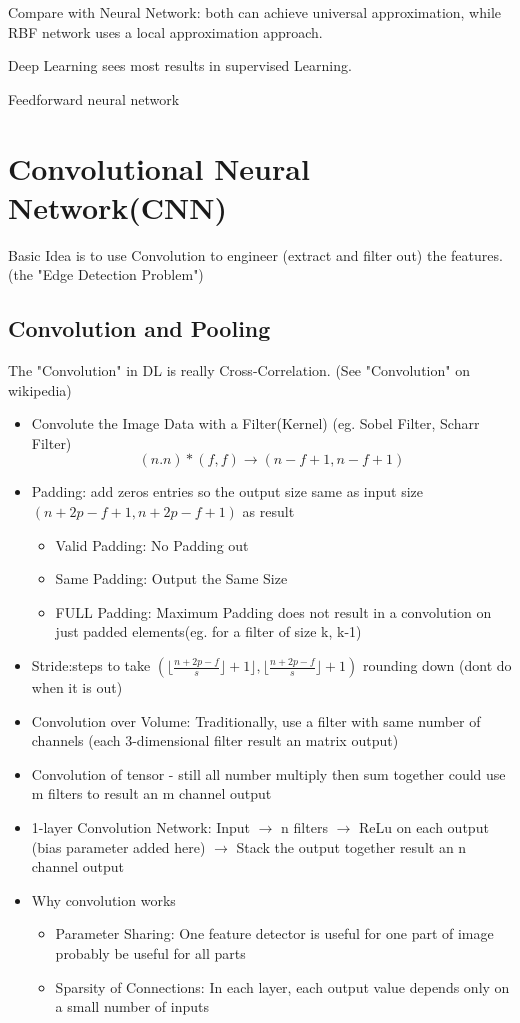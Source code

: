 \documentclass[11pt, openany]{book}              %
\begin{document}
Compare with Neural Network: both can achieve universal approximation, while RBF network uses a local approximation approach. 

Deep Learning sees most results in supervised Learning.

Feedforward neural network 



\section{Convolutional Neural Network(CNN)}

Basic Idea is to use Convolution to engineer (extract and filter out) the features. (the "Edge Detection Problem")

\subsection{Convolution and Pooling}

The "Convolution" in DL is really Cross-Correlation. (See "Convolution" on wikipedia)
\begin{itemize}
\item Convolute the Image Data with a Filter(Kernel) (eg. Sobel Filter, Scharr Filter)
$$(n.n) * (f, f) \rightarrow (n-f+1, n-f+1)$$
\item Padding: add zeros entries so the output size same as input size
$(n+2p-f+1, n+2p-f+1)$ as result
\begin{itemize}
	\item Valid Padding: No Padding out
	\item Same Padding: Output the Same Size
	\item FULL Padding: Maximum Padding does not result in a convolution on just padded elements(eg. for a filter of size k, k-1)
\end{itemize}
\item Stride:steps to take
$(\lfloor \frac{n+2p−f}{s}⌋+1 \rfloor, \lfloor \frac{n+2p−f}{s}\rfloor + 1)$ rounding down (dont do when it is out)
\item Convolution over Volume: Traditionally, use a filter with same number of channels (each 3-dimensional filter result an matrix output)
\item Convolution of tensor - still all number multiply then sum together
could use m filters to result an m channel output
\item 1-layer Convolution Network: Input $\rightarrow$ n filters $\rightarrow$ ReLu on each output (bias parameter added here) $\rightarrow$ Stack the output together result an n channel output 
\item Why convolution works
	\begin{itemize}
	\item Parameter Sharing: One feature detector is useful for one part of image probably be useful for all parts
	\item Sparsity of Connections: In each layer, each output value depends only on a small number of inputs
	\end{itemize}
\end{itemize}
\end{document}
